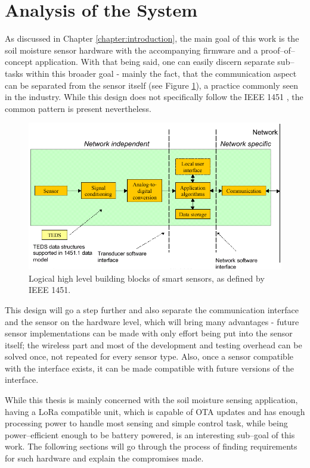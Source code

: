 
\section{Analysis of the System}
As discussed in Chapter \ref{chapter:introduction}, the main goal of this work is the soil moisture sensor hardware with the accompanying firmware and a proof--of--concept application. With that being said, one can easily discern separate sub--tasks within this broader goal - mainly the fact, that the communication aspect can be separated from the sensor itself (see Figure \ref{fig:device-split}), a practice commonly seen in the industry. While this design does not specifically follow the IEEE 1451 \cite{mark_ieee_nodate}, the common pattern is present nevertheless.

\begin{figure}
    \includegraphics[width=\textwidth]{fig/ieee-1451.png}
    \caption{\label{fig:device-split}Logical high level building blocks of smart sensors, as defined by IEEE 1451.}
\end{figure}

This design will go a step further and also separate the communication interface and the sensor on the hardware level, which will bring many advantages - future sensor implementations can be made with only effort being put into the sensor itself; the wireless part and most of the development and testing overhead can be solved once, not repeated for every sensor type. Also, once a sensor compatible with the interface exists, it can be made compatible with future versions of the interface.

While this thesis is mainly concerned with the soil moisture sensing application, having a LoRa compatible unit, which is capable of OTA updates and has enough processing power to handle most sensing and simple control task, while being power--efficient enough to be battery powered, is an interesting sub--goal of this work. The following sections will go through the process of finding requirements for such hardware and explain the compromises made.

